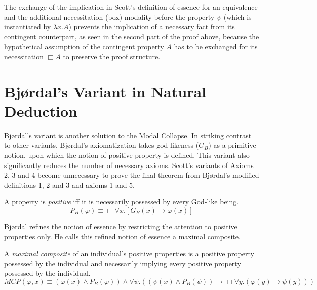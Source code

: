 \documentclass[smallextended]{svjour3}
\newcommand{\imp}{\rightarrow}
\newcommand{\all}{\forall}
\newcommand{\nec}{\Box} %
\begin{document}
The exchange of the implication in Scott's definition of essence for an equivalence and the additional necessitation (box) modality before the property $\psi$ (which is instantiated by $\lambda x. A$) prevents the implication of a necessary fact from its contingent counterpart, as seen in the second part of the proof above, because the hypothetical assumption of the contingent property $A$ has to be exchanged for its necessitation $\nec A$ to preserve the proof structure. 



\section{Bj{\o}rdal's Variant in Natural Deduction}
\label{sec:bjordal}


\setcounter{lemma}{0}
\setcounter{theorem}{0}
\setcounter{corollary}{0}


Bj{\o}rdal's variant \citep{bjordal,fuhrmann} is another solution to the Modal Collapse. In striking contrast to other variants, Bj\o rdal's axiomatization takes god-likeness ($G_B$) as a primitive notion, upon which the notion of positive property is defined. This variant also significantly reduces the number of necessary axioms. Scott's variants of Axioms 2, 3 and 4 become unnecessary to prove the final theorem from Bj{\o}rdal's modified definitions 1, 2 and 3 and axioms 1 and 5.


\setcounter{definition}{0}
\begin{definition}[Changed]
\label{B:D1}
A property is \emph{positive} iff it is necessarily possessed by every God-like being.
$$
P_B(\varphi) \equiv \nec \all x. [G_B(x) \imp \varphi(x)]
$$
\end{definition}

Bj{\o}rdal refines the notion of essence by restricting the attention to positive properties only. He calls this refined notion of essence a maximal composite.

\newcommand{\MCP}{\mathit{MCP}}

\begin{definition}[Changed]
\label{B:D2}
A \emph{maximal composite} of an individual's positive properties is a positive property possessed by the individual and necessarily implying every positive property possessed by the individual.
$$\MCP(\varphi, x) \equiv (\varphi(x) \wedge P_B (\varphi)) \wedge \all\psi.((\psi(x) \wedge P_B (\psi)) \imp \nec\all y.(\varphi(y) \imp \psi(y)))
$$
\end{definition}
\end{document}
